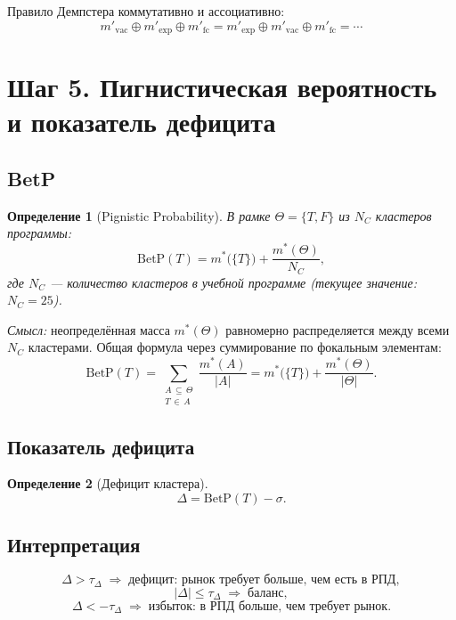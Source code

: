 \documentclass[12pt,a4paper]{article}
\newtheorem{definition}{Определение}
\begin{document}
Правило Демпстера коммутативно и ассоциативно:
\[
  m'_{\mathrm{vac}} \oplus m'_{\mathrm{exp}} \oplus m'_{\mathrm{fc}}
  = m'_{\mathrm{exp}} \oplus m'_{\mathrm{vac}} \oplus m'_{\mathrm{fc}}
  = \cdots
\]

\section{Шаг 5. Пигнистическая вероятность и показатель дефицита}

\subsection{BetP}

\begin{definition}[Pignistic Probability]
  В рамке $\Theta = \{T, F\}$ из $N_C$ кластеров программы:
  \[
    \mathrm{BetP}(T)
      = m^*\!\bigl(\{T\}\bigr)
        + \frac{m^*(\Theta)}{N_C},
  \]
  где $N_C$ --- количество кластеров в учебной программе
  (текущее значение: $N_C = 25$).
\end{definition}

\noindent
\textit{Смысл:} неопределённая масса $m^*(\Theta)$ равномерно
распределяется между всеми $N_C$ кластерами.
Общая формула через суммирование по фокальным элементам:
\[
  \mathrm{BetP}(T)
    = \sum_{\substack{A \,\subseteq\, \Theta \\ T \,\in\, A}}
        \frac{m^*(A)}{|A|}
    = m^*\!\bigl(\{T\}\bigr) + \frac{m^*(\Theta)}{|\Theta|}.
\]

\subsection{Показатель дефицита}

\begin{definition}[Дефицит кластера]
  \[
    \Delta = \mathrm{BetP}(T) - \sigma.
  \]
\end{definition}

\subsection{Интерпретация}

\[
  \Delta > \tau_\Delta
    \;\Rightarrow\; \text{дефицит: рынок требует больше, чем есть в РПД},
\]
\[
  |\Delta| \le \tau_\Delta
    \;\Rightarrow\; \text{баланс},
\]
\[
  \Delta < -\tau_\Delta
    \;\Rightarrow\; \text{избыток: в РПД больше, чем требует рынок}.
\]
\end{document}
